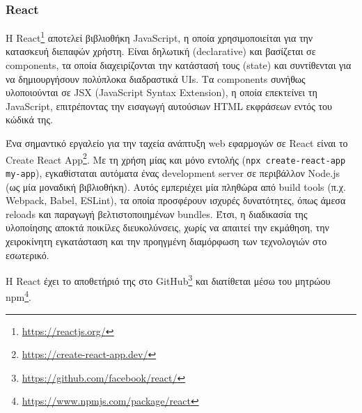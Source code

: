 \subsubsection{React} \label{subsection:4-2-2-1-react}


Η React\footnote{\url{https://reactjs.org/}} αποτελεί βιβλιοθήκη JavaScript, η οποία χρησιμοποιείται για την κατασκευή διεπαφών χρήστη. Είναι δηλωτική (declarative) και βασίζεται σε components, τα οποία διαχειρίζονται την κατάστασή τους (state) και συντίθενται για να δημιουργήσουν πολύπλοκα διαδραστικά UIs. Τα components συνήθως υλοποιούνται σε JSX (JavaScript Syntax Extension), η οποία επεκτείνει τη JavaScript, επιτρέποντας την εισαγωγή αυτούσιων HTML εκφράσεων εντός του κώδικά της.

Ένα σημαντικό εργαλείο για την ταχεία ανάπτυξη web εφαρμογών σε React είναι το Create React App\footnote{\url{https://create-react-app.dev/}}. Με τη χρήση μίας και μόνο εντολής (\texttt{npx create-react-app my-app}), εγκαθίσταται αυτόματα ένας development server σε περιβάλλον Node.js (ως μία μοναδική βιβλιοθήκη). Αυτός εμπεριέχει μία πληθώρα από build tools (π.χ. Webpack, Babel, ESLint), τα οποία προσφέρουν ισχυρές δυνατότητες, όπως άμεσα reloads και παραγωγή βελτιστοποιημένων bundles. Έτσι, η διαδικασία της υλοποίησης αποκτά ποικίλες διευκολύνσεις, χωρίς να απαιτεί την εκμάθηση, την χειροκίνητη εγκατάσταση και την προηγμένη διαμόρφωση των τεχνολογιών στο εσωτερικό. 

Η React έχει το αποθετήριό της στο GitHub\footnote{\url{https://github.com/facebook/react/}} και διατίθεται μέσω του μητρώου npm\footnote{\url{https://www.npmjs.com/package/react}}.
